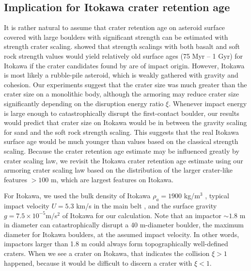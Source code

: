 \documentclass[3p,authoryear]{elsarticle}
\begin{document}
 \subsection{Implication for Itokawa crater retention age}\label{sec:itokawa-age}
It is rather natural to assume that crater retention age on asteroid surface covered with large boulders with significant strength can be estimated with strength crater scaling. \citet{michel2009} showed that strength scalings with both basalt and soft rock strength values would yield relatively old surface ages (75 Myr -- 1 Gyr) for Itokawa if the crater candidates found by \citet{hirata2009} are of impact origin.
 However, Itokawa is most likely a rubble-pile asteroid, which is weakly gathered with gravity and cohesion.
 Our experiments suggest that the crater size was much greater than the crater size on a monolithic body, although the armoring may reduce crater size significantly depending on the disruption energy ratio $\xi$.
 Whenever impact energy is large enough to catastrophically disrupt the first-contact boulder, our results would predict that crater size on Itokawa would be in between the gravity scaling for sand and the soft rock strength scaling. This suggests that the real Itokawa surface age would be much younger than values based on the classical strength scaling.
Because the crater retention age estimate may be influenced greatly by crater scaling law, we revisit the Itokawa crater retention age estimate using our armoring crater scaling law based on the distribution of the larger crater-like features $>100$ m, which are largest features on Itokawa.

For Itokawa, we used the bulk density of Itokawa $\rho_a=1900$ kg/m$^3$ \citep{fujiwara2006}, typical impact velocity $U=5.3$ km/s in the main belt \citep{bottke1994}, and the surface gravity $g=7.5\times 10^{-5}$m/s$^2$ \citep{tancredi2015} of Itokawa for our calculation.
Note that an impactor $\sim 1.8$ m in diameter can catastrophically disrupt a 40 m-diameter boulder, the maximum diameter for Itokawa boulders, at the assumed impact velocity.
In other words, impactors larger than 1.8 m could always form topographically well-defined craters.
When we see a crater on Itokawa, that indicates the collision $\xi>1$ happened, because it would be difficult to discern a crater with $\xi<1$.
\end{document}
